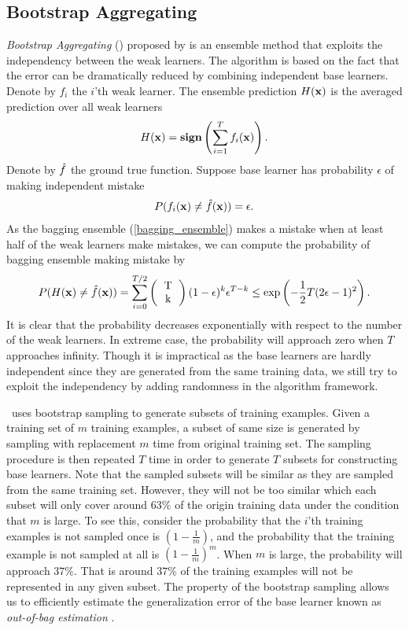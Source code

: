 {\subsection{Bootstrap Aggregating} \label{sc_ba}

\textit{Bootstrap Aggregating} (\bagging) proposed by \citet{Breiman96bagging} is an ensemble method that exploits the independency between the weak learners.
The algorithm is based on the fact that the error can be dramatically reduced by combining independent base learners.
Denote by $f_i$ the $i$'th weak learner.
The ensemble prediction $H(\mathbf {x})$ is the averaged prediction over all weak learners
\begin{align}
	H(\mathbf {x}) = \textbf{sign}\left(\sum_{i=1}^{T}f_i(\mathbf {x})\right). \label{bagging_ensemble}
\end{align}
Denote by ${\hat{f}}$ the ground true function.
Suppose base learner has probability $\epsilon$ of making independent mistake
\begin{align*}
	P(f_i(\mathbf {x}) \ne {\hat{f}}(\mathbf {x})) = \epsilon.
\end{align*}
As the bagging ensemble (\ref{bagging_ensemble}) makes a mistake when at least half of the weak learners make mistakes, we can compute the probability of bagging ensemble making mistake by
\begin{align*}
	P(H(\vx)\neq\hatf(\vx)) = \sum_{i=0}^{T/2}\left(\begin{tabular}{cc}T\\k\end{tabular}\right)(1-\epsilon)^k\epsilon^{T-k} \le\exp\left(-\frac{1}{2}T(2\epsilon-1)^2\right).
\end{align*}
It is clear that the probability decreases exponentially with respect to the number of the weak learners.
In extreme case, the probability will approach zero when $T$ approaches infinity.
Though it is impractical as the base learners are hardly independent since they are generated from the same training data, we still try to exploit the independency by adding randomness in the algorithm framework.

\bagging\ uses bootstrap sampling \citep{Efron1994introduction} to generate subsets of training examples.
Given a training set of $m$ training examples, a subset of same size is generated by sampling with replacement $m$ time from original training set.
The sampling procedure is then repeated $T$ time in order to generate $T$ subsets for constructing base learners.
Note that the sampled subsets will be similar as they are sampled from the same training set.
However, they will not be too similar which each subset will only cover around $63\%$ of the origin training data under the condition that $m$ is large.
To see this, consider the probability that the $i$'th training examples is not sampled once is $(1-\frac{1}{m})$, and the probability that the training example is not sampled at all is $(1-\frac{1}{m})^m$.
When $m$ is large, the probability will approach $37\%$. 
That is around $37\%$ of the training examples will not be represented in any given subset.
The property of the bootstrap sampling allows us to efficiently estimate the generalization error of the base learner known as \textit{out-of-bag estimation} \citep{Breiman96out,Tibshirani1996bias,Wolpert99an}.

}
